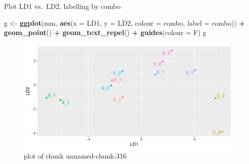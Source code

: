 \documentclass[ignorenonframetext,]{beamer}
\newenvironment{Shaded}{\begin{snugshade}}{\end{snugshade}}
\newcommand{\DataTypeTok}[1]{\textcolor[rgb]{0.13,0.29,0.53}{#1}}
\newcommand{\KeywordTok}[1]{\textcolor[rgb]{0.13,0.29,0.53}{\textbf{#1}}}
\newcommand{\NormalTok}[1]{#1}
\newcommand{\OperatorTok}[1]{\textcolor[rgb]{0.81,0.36,0.00}{\textbf{#1}}}
\newcommand{\StringTok}[1]{\textcolor[rgb]{0.31,0.60,0.02}{#1}}
\begin{document}
\begin{frame}[fragile]{Plot LD1 vs.~LD2, labelling by combo}
\protect\hypertarget{plot-ld1-vs.ld2-labelling-by-combo}{}

\begin{Shaded}
\begin{Highlighting}[]
\NormalTok{g <-}\StringTok{ }\KeywordTok{ggplot}\NormalTok{(mm, }\KeywordTok{aes}\NormalTok{(}\DataTypeTok{x =}\NormalTok{ LD1, }\DataTypeTok{y =}\NormalTok{ LD2, }\DataTypeTok{colour =}\NormalTok{ combo, }
                    \DataTypeTok{label =}\NormalTok{ combo)) }\OperatorTok{+}\StringTok{ }\KeywordTok{geom_point}\NormalTok{() }\OperatorTok{+}
\StringTok{  }\KeywordTok{geom_text_repel}\NormalTok{() }\OperatorTok{+}\StringTok{ }\KeywordTok{guides}\NormalTok{(}\DataTypeTok{colour =}\NormalTok{ F)}
\NormalTok{g}
\end{Highlighting}
\end{Shaded}

\begin{figure}
\centering
\includegraphics{figure/unnamed-chunk-316-1.pdf}
\caption{plot of chunk unnamed-chunk-316}
\end{figure}

\end{frame}
\end{document}
